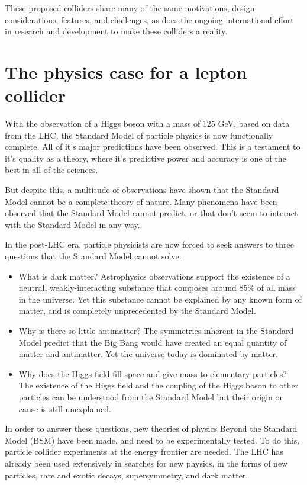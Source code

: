 These proposed colliders share many of the same motivations, design considerations, features, and challenges, as does the ongoing international effort in research and development to make these colliders a reality.

\section{The physics case for a lepton collider}
With the observation of a Higgs boson with a mass of 125 GeV, based on data from the \acrlong{LHC}, the Standard Model of particle physics is now functionally complete. All of it's major predictions have been observed. This is a testament to it's quality as a theory, where it's predictive power and accuracy is one of the best in all of the sciences.

But despite this, a multitude of observations have shown that the Standard Model cannot be a complete theory of nature. Many phenomena have been observed that the Standard Model cannot predict, or that don't seem to interact with the Standard Model in any way.

In the post-LHC era, particle physicists are now forced to seek answers to three questions that the Standard Model cannot solve:

\begin{itemize}
	\item What is dark matter? Astrophysics observations support the existence of a neutral, weakly-interacting substance that composes around 85\% of all mass in the universe. Yet this substance cannot be explained by any known form of matter, and is completely unprecedented by the Standard Model.
	\item Why is there so little antimatter? The symmetries inherent in the Standard Model predict that the Big Bang would have created an equal quantity of matter and antimatter. Yet the universe today is dominated by matter.
	\item Why does the Higgs field fill space and give mass to elementary particles? The existence of the Higgs field and the coupling of the Higgs boson to other particles can be understood from the Standard Model but their origin or cause is still unexplained.
\end{itemize}

In order to answer these questions, new theories of physics Beyond the Standard Model (\acrshort{BSM}) have been made, and need to be experimentally tested. To do this, particle collider experiments at the energy frontier are needed. The \acrfull{LHC} has already been used extensively in searches for new physics, in the forms of new particles, rare and exotic decays, supersymmetry, and dark matter.


